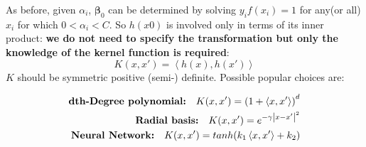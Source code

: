 \documentclass[12pt, letterpaper]{article}
\theoremstyle{definition}
\newcommand{\be}{\mathbf{\beta}}
\DeclarePairedDelimiter\autobracket{(}{)}
\newcommand{\br}[1]{\autobracket*{#1}}
\begin{document}
As before, given $\alpha_i$, $\be_0$ can be determined by solving $y_i f(x_i) = 1$ for any(or all) $x_i$ for which $0<\alpha_i <C$.
So $h(x0)$ is involved only in terms of its inner product: \textbf{we do not need to specify the transformation but only the knowledge of the kernel function is required}:
\begin{equation}
K(x, x') = \left\langle  h(x), h(x')  \right\rangle
\end{equation}
$K$ should be symmetric positive (semi-) definite.   Possible popular choices are:

\begin{equation}
\begin{aligned}
\textbf{dth-Degree polynomial:} \quad K(x, x') = \br{1+\left\langle  x,x'  \right\rangle}^d\\
\textbf{Radial basis:} \quad K(x, x') =e^{-\gamma\left| x-x' \right|^2}\\
\textbf{Neural Network:} \quad K(x, x') = tanh\br{k_1\left\langle  x,x'  \right\rangle+k_2}\\
\end{aligned}
\end{equation}
\end{document}
